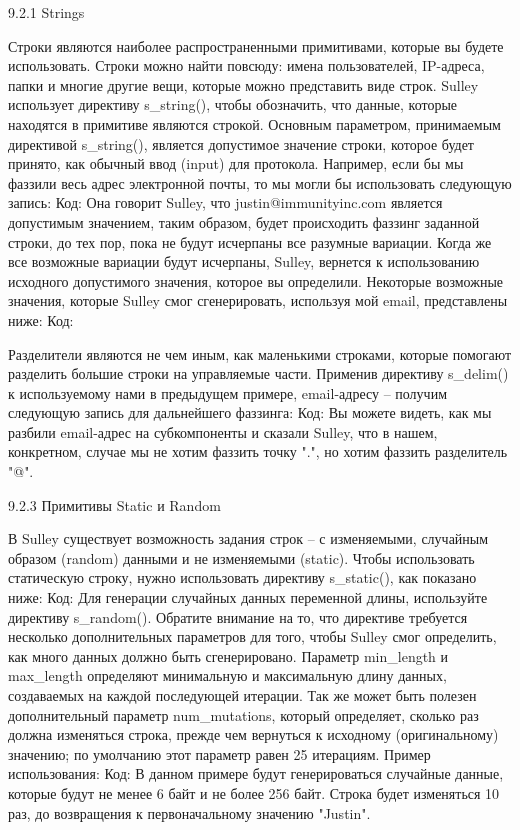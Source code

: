 \documentclass[12pt, a4paper, oneside]{book}
\begin{document}
9.2.1 Strings

Строки являются наиболее распространенными примитивами, которые вы будете использовать. Строки можно найти повсюду: имена пользователей, IP-адреса, папки и многие другие вещи, которые можно представить виде строк. Sulley использует директиву s\_string(), чтобы обозначить, что данные, которые находятся в примитиве являются строкой. Основным параметром, принимаемым директивой s\_string(), является допустимое значение строки, которое будет принято, как обычный ввод (input) для протокола. Например, если бы мы фаззили весь адрес электронной почты, то мы могли бы использовать следующую запись:
Код:
Она говорит Sulley, что justin@immunityinc.com является допустимым значением, таким образом, будет происходить фаззинг заданной строки, до тех пор, пока не будут исчерпаны все разумные вариации. Когда же все возможные вариации будут исчерпаны, Sulley, вернется к использованию исходного допустимого значения, которое вы определили. Некоторые возможные значения, которые Sulley смог сгенерировать, используя мой email, представлены ниже:
Код:

Разделители являются не чем иным, как маленькими строками, которые помогают разделить большие строки на управляемые части. Применив директиву s\_delim() к используемому нами в предыдущем примере, email-адресу – получим следующую запись для дальнейшего фаззинга:
Код:
Вы можете видеть, как мы разбили email-адрес на субкомпоненты и сказали Sulley, что в нашем, конкретном, случае мы не хотим фаззить точку ".", но хотим фаззить разделитель "@". 

9.2.3 Примитивы Static и Random

В Sulley существует возможность задания строк – с изменяемыми, случайным образом (random) данными и не изменяемыми (static). Чтобы использовать статическую строку, нужно использовать директиву s\_static(), как показано ниже:
Код:
Для генерации случайных данных переменной длины, используйте директиву s\_random(). Обратите внимание на то, что директиве требуется несколько дополнительных параметров для того, чтобы Sulley смог определить, как много данных должно быть сгенерировано. Параметр min\_length и max\_length определяют минимальную и максимальную длину данных, создаваемых на каждой последующей итерации. Так же может быть полезен дополнительный параметр num\_mutations, который определяет, сколько раз должна изменяться строка, прежде чем вернуться к исходному (оригинальному) значению; по умолчанию этот параметр равен 25 итерациям. Пример использования:
Код:
В данном примере будут генерироваться случайные данные, которые будут не менее 6 байт и не более 256 байт. Строка будет изменяться 10 раз, до возвращения к первоначальному значению "Justin".
\end{document}
